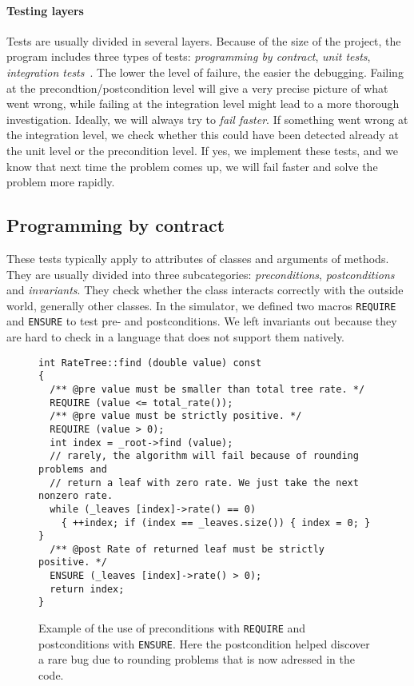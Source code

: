 \paragraph{Testing layers} Tests are usually divided in several layers. Because of the size of the project, the program includes three types of tests: \emph{programming by contract}, \emph{unit tests}, \emph{integration tests}~. The lower the level of failure, the easier the debugging. Failing at the precondtion/postcondition level will give a very precise picture of what went wrong, while failing at the integration level might lead to a more thorough investigation. Ideally, we will always try to \emph{fail faster}. If something went wrong at the integration level, we check whether this could have been detected already at the unit level or the precondition level. If yes, we implement these tests, and we know that next time the problem comes up, we will fail faster and solve the problem more rapidly.


\subsection{Programming by contract} 

These tests typically apply to attributes of classes and arguments of methods. They are usually divided into three subcategories: \emph{preconditions}, \emph{postconditions} and \emph{invariants}. They check whether the class interacts correctly with the outside world, generally other classes. In the simulator, we defined two macros \texttt{REQUIRE} and \texttt{ENSURE} to test pre- and postconditions. We left invariants out because they are hard to check in a language that does not support them natively.

\begin{figure}[!h]
  \centering
\begin{verbatim}
int RateTree::find (double value) const
{
  /** @pre value must be smaller than total tree rate. */
  REQUIRE (value <= total_rate());
  /** @pre value must be strictly positive. */
  REQUIRE (value > 0);
  int index = _root->find (value);
  // rarely, the algorithm will fail because of rounding problems and 
  // return a leaf with zero rate. We just take the next nonzero rate.
  while (_leaves [index]->rate() == 0) 
    { ++index; if (index == _leaves.size()) { index = 0; } }
  /** @post Rate of returned leaf must be strictly positive. */
  ENSURE (_leaves [index]->rate() > 0);
  return index;
}
\end{verbatim}
\caption{Example of the use of preconditions with \texttt{REQUIRE} and postconditions with \texttt{ENSURE}. Here the postcondition helped discover a rare bug due to rounding problems that is now adressed in the code.}
\label{fig:prepostconditions}
\end{figure}

